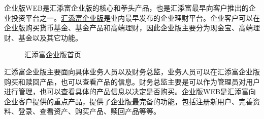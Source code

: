 企业版WEB是汇添富企业版的核心和拳头产品，也是汇添富最早向客户推出的企业投资平台之一。\href{https://qy.99fund.com}{汇添富企业版}是业内最早发布的企业理财平台。企业客户可以在企业版购买货币基金、基金产品和高端理财，因此企业版主要分为现金宝、高端理财、基金以及其它功能。 \par

\begin{figure}[htbp!]
  \centering
  \caption{汇添富企业版首页}
\end{figure}

汇添富企业版主要面向具体业务人员以及财务总监，业务人员可以在汇添富企业版购买和赎回产品，也可以查看产品的信息。财务总监主要是可以作为管理员对用户进行管理，也可以查看具体的产品信息以决定是否购买。企业版WEB是汇添富向企业客户提供的重点产品，提供了企业版最完备的功能，包括注册新用户、完善资料、登录、查看资产、购买产品、赎回产品等等。
